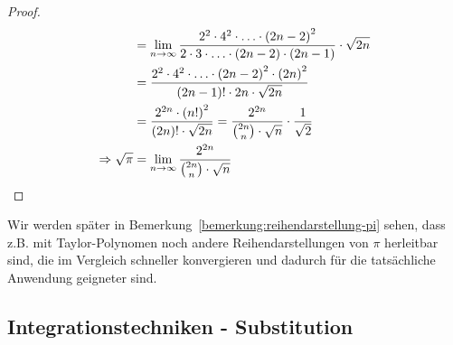 \begin{satz}
\begin{proof}
\begin{align*}
            &= \lim_{n\rightarrow{}\infty} \frac{2^2 \cdot 4^2\cdot \ldots \cdot \left(2n-2\right)^2}{2\cdot 3 \cdot \ldots \cdot \left(2n-2\right)\cdot\left(2n-1\right)}\cdot\sqrt{2n}\\
            &= \frac{2^2\cdot 4^2\cdot\ldots \cdot \left(2n-2\right)^2\cdot\left(2n\right)^2}{\left(2n-1\right)!\cdot 2n\cdot\sqrt{2n}}\\
            &= \frac{2^{2n}\cdot\left(n!\right)^2}{\left(2n\right)!\cdot\sqrt{2n}} = \frac{2^{2n}}{\binom{2n}{n}\cdot\sqrt{n}}\cdot \frac{1}{\sqrt{2}}\\
            \Rightarrow{} \sqrt{\pi} &= \lim_{n\rightarrow{}\infty} \frac{2^{2n}}{\binom{2n}{n}\cdot\sqrt{n}}
        \end{align*}
    \end{proof}
    Wir werden später in Bemerkung~\ref{bemerkung:reihendarstellung-pi} sehen, dass z.B. mit Taylor-Polynomen noch andere Reihendarstellungen von $\pi$ herleitbar sind, die im Vergleich schneller konvergieren und dadurch für die tatsächliche Anwendung geigneter sind.
\end{satz}

\subsection{Integrationstechniken - Substitution}

